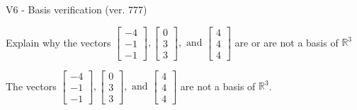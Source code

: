 \begin{exercise}
  \begin{exerciseTitle}V6 - Basis verification (ver. 777)\end{exerciseTitle}
  \begin{exerciseStatement}
    Explain why the vectors \(\left[\begin{array}{r}
-4 \\
-1 \\
-1
\end{array}\right] , \left[\begin{array}{r}
0 \\
3 \\
3
\end{array}\right] , \text{ and } \left[\begin{array}{r}
4 \\
4 \\
4
\end{array}\right]\) are or are not a basis of \(\mathbb{R}^3\)	


  \end{exerciseStatement}
  \begin{exerciseAnswer}
   The vectors \(\left[\begin{array}{r}
-4 \\
-1 \\
-1
\end{array}\right] , \left[\begin{array}{r}
0 \\
3 \\
3
\end{array}\right] , \text{ and } \left[\begin{array}{r}
4 \\
4 \\
4
\end{array}\right]\) 
  	 are not  a basis of \(\mathbb{R}^3\).
  


  \end{exerciseAnswer}
\end{exercise}